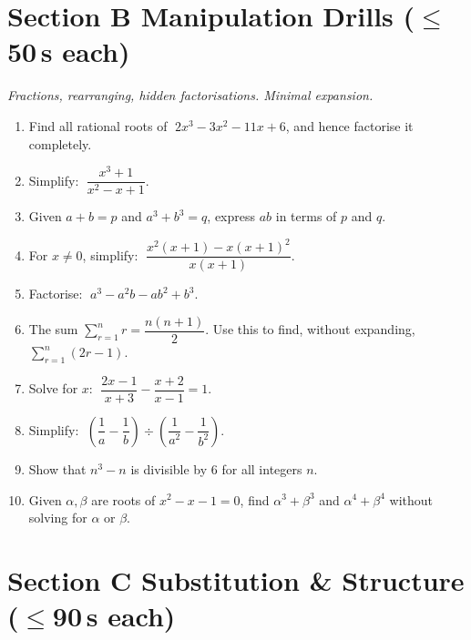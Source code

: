 \documentclass[11pt,a4paper]{article}
\begin{document}
\section*{Section B \quad Manipulation Drills \hfill{\normalfont\small($\leq$50\,s each)}}

\noindent\textit{Fractions, rearranging, hidden factorisations. Minimal expansion.}

\begin{enumerate}

\item Find all rational roots of $\;2x^3-3x^2-11x+6$, and hence factorise it completely.

\item Simplify: $\;\dfrac{x^3+1}{x^2-x+1}$.

\item Given $a+b=p$ and $a^3+b^3=q$, express $ab$ in terms of $p$ and $q$.

\item For $x\neq0$, simplify: $\;\dfrac{x^2(x+1)-x(x+1)^2}{x(x+1)}$.

\item Factorise: $\;a^3-a^2b-ab^2+b^3$.

\item The sum $\displaystyle\sum_{r=1}^{n}r = \dfrac{n(n+1)}{2}$.
      Use this to find, without expanding, $\displaystyle\sum_{r=1}^{n}(2r-1)$.

\item Solve for $x$: $\;\dfrac{2x-1}{x+3}-\dfrac{x+2}{x-1}=1$.

\item Simplify: $\;\left(\dfrac{1}{a}-\dfrac{1}{b}\right)\div\left(\dfrac{1}{a^2}-\dfrac{1}{b^2}\right)$.

\item Show that $n^3-n$ is divisible by 6 for all integers $n$.

\item Given $\alpha,\beta$ are roots of $x^2-x-1=0$, find $\alpha^3+\beta^3$
      and $\alpha^4+\beta^4$ without solving for $\alpha$ or $\beta$.

\end{enumerate}

\section*{Section C \quad Substitution \& Structure \hfill{\normalfont\small($\leq$90\,s each)}}
\end{document}
